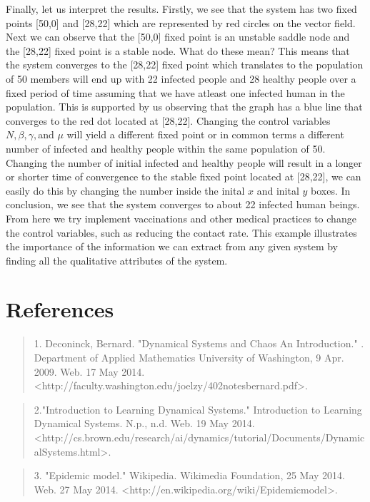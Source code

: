 \documentclass{article}
\begin{document}
\newline
Finally, let us interpret the results.
\newline
Firstly, we see that the system has two fixed points  [50,0] and [28,22] which are represented by red circles on the vector field. Next we can observe that the [50,0] fixed point is an unstable saddle node and the [28,22] fixed point is a stable node. 
\newline
\linebreak
What do these mean? 
\newline
\linebreak
This means that the system converges to the [28,22] fixed point which translates to the population of 50 members will end up with 22 infected people and 28 healthy people over a fixed period of time assuming that we have atleast one infected human in the population. This is supported by us observing that the graph has a blue line that converges to the red dot located at [28,22]. Changing the control variables $N,\beta,\gamma,$and $\mu$ will yield a different fixed point or in common terms a different number of infected and healthy people within the same population of 50. Changing the number of initial infected and healthy people will result in a longer or shorter time of convergence to the stable fixed point located at [28,22], we can easily do this by changing the number inside the inital $x$ and inital $y$ boxes.
In conclusion, we see that the system converges to about 22 infected human beings. From here we try implement vaccinations and other medical practices to change the control variables, such as reducing the contact rate. This example illustrates the importance of the information we can extract from any given system by finding all the qualitative attributes of the system.
\newpage
\section{References}
\begin{quote}
1. Deconinck, Bernard. "Dynamical Systems and Chaos An Introduction." . Department of Applied Mathematics University of Washington, 9 Apr. 2009. Web. 17 May 2014. <http://faculty.washington.edu/joelzy/402notesbernard.pdf>.
\end{quote}

\begin{quote}
2."Introduction to Learning Dynamical Systems." Introduction to Learning Dynamical Systems. N.p., n.d. Web. 19 May 2014. <http://cs.brown.edu/research/ai/dynamics/tutorial/Documents/DynamicalSystems.html>.
\end{quote}
\begin{quote}
3. "Epidemic model." Wikipedia. Wikimedia Foundation, 25 May 2014. Web. 27 May 2014. <http://en.wikipedia.org/wiki/Epidemicmodel>.
\end{quote}
\end{document}
